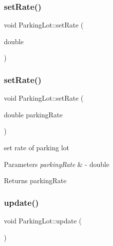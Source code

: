 \subsubsection{\texorpdfstring{set\+Rate()}{setRate()}\hspace{0.1cm}{\footnotesize\ttfamily [1/2]}}
{\footnotesize\ttfamily void Parking\+Lot\+::set\+Rate (\begin{DoxyParamCaption}\item[{double}]{ }\end{DoxyParamCaption})}

\mbox{\label{class_parking_lot_a0e8557c93fba850a9cdbd9e76d49a3eb}} 
\subsubsection{\texorpdfstring{set\+Rate()}{setRate()}\hspace{0.1cm}{\footnotesize\ttfamily [2/2]}}
{\footnotesize\ttfamily void Parking\+Lot\+::set\+Rate (\begin{DoxyParamCaption}\item[{double}]{parking\+Rate }\end{DoxyParamCaption})}



set rate of parking lot 


\begin{DoxyParams}{Parameters}
{\em parking\+Rate} & -\/ double \\
\hline
\end{DoxyParams}
\begin{DoxyReturn}{Returns}
parking\+Rate 
\end{DoxyReturn}
\mbox{\label{class_parking_lot_a92c159f21260da7fd2bba061f1781382}} 
\subsubsection{\texorpdfstring{update()}{update()}}
{\footnotesize\ttfamily void Parking\+Lot\+::update (\begin{DoxyParamCaption}{ }\end{DoxyParamCaption})}



